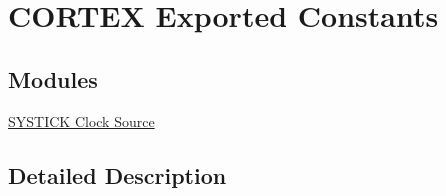 \hypertarget{group___c_o_r_t_e_x___l_l___exported___constants}{}\section{C\+O\+R\+T\+EX Exported Constants}
\label{group___c_o_r_t_e_x___l_l___exported___constants}
\subsection*{Modules}
\begin{DoxyCompactItemize}
\item 
\hyperlink{group___c_o_r_t_e_x___l_l___e_c___c_l_k_s_o_u_r_c_e___h_c_l_k}{S\+Y\+S\+T\+I\+C\+K Clock Source}
\end{DoxyCompactItemize}


\subsection{Detailed Description}
